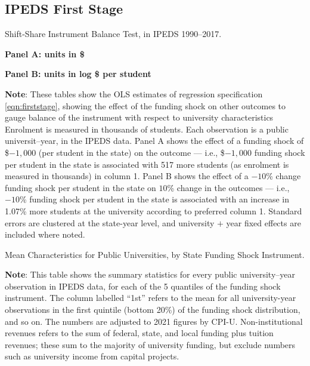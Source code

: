 \subsection{IPEDS First Stage}
\begin{table}[H]
    \singlespacing
    \centering
    \caption{Shift-Share Instrument Balance Test, in IPEDS 1990--2017.}

    \textbf{Panel A: units in \$}

    \makebox[\textwidth][c]{}
    
    \textbf{Panel B: units in log \$ per student}
    
    \makebox[\textwidth][c]{}

    \justify
    \footnotesize
    \textbf{Note}:
    These tables show the OLS estimates of regression specification \autoref{eqn:firststage}, showing the effect of the funding shock on other outcomes to gauge balance of the instrument with respect to university characteristics
    Enrolment is measured in thousands of students.
    Each observation is a public universit--year, in the IPEDS data.
    Panel A shows the effect of a funding shock of \$$-1,000$ (per student in the state) on the outcome --- i.e.,
    \$$-1,000$ funding shock per student in the state is associated with 517 more students (as enrolment is measured in thousands) in column 1.
    Panel B shows the effect of a $-10$\% change funding shock per student in the state on $10$\% change in the outcomes --- i.e.,
    $-10$\% funding shock per student in the state is associated with an increase in 1.07\% more students at the university according to preferred column 1.
    Standard errors are clustered at the state-year level, and university $+$ year fixed effects are included where noted.
    \label{tab:firststage-balance}
\end{table}

\begin{table}[H]
    \singlespacing
    \caption{Mean Characteristics for Public Universities, by State Funding Shock Instrument.}
    \makebox[\textwidth][c]{}
    \label{tab:summary-quantiles}
    \justify
    \footnotesize
    \textbf{Note}:
    This table shows the summary statistics for every public university--year observation in IPEDS data, for each of the 5 quantiles of the funding shock instrument.
    The column labelled ``1st'' refers to the mean for all university-year observations in the first quintile (bottom 20\%) of the funding shock distribution, and so on.
    The numbers are adjusted to 2021 figures by CPI-U.
    Non-institutional revenues refers to the sum of federal, state, and local funding plus tuition revenues; these sum to the majority of university funding, but exclude numbers such as university income from capital projects.
\end{table}

